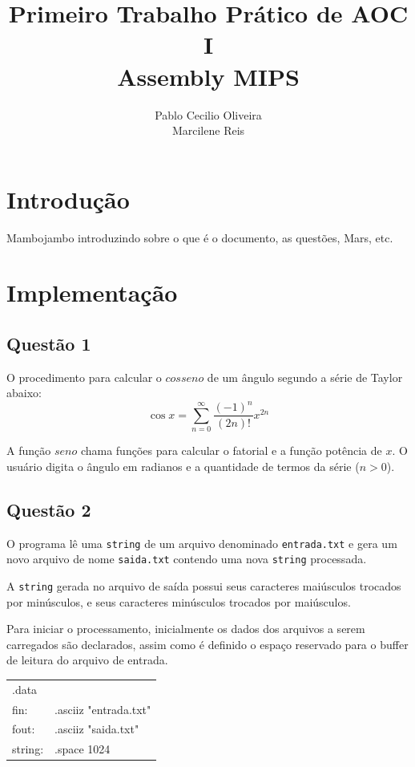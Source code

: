 \documentclass[12pt,a4paper]{article}
\author{Pablo Cecilio Oliveira\\
Marcilene Reis}
\title{Primeiro Trabalho Prático de AOC I\\
Assembly MIPS}
\date{}
\numberwithin{figure}{subsection}
\numberwithin{table}{subsection}
\begin{document}
\maketitle

\section{Introdução}

Mambojambo introduzindo sobre o que é o documento, as questões, Mars, etc.

\lipsum[1]

\section{Implementação}

\subsection{Questão 1}

O procedimento para calcular o $cosseno$ de um ângulo segundo a série de Taylor abaixo:
\[ \cos x = \sum_{n=0}^{\infty} \frac{(-1)^n}{(2n)!} x^{2n} \]

A função $seno$ chama funções para calcular o fatorial e a função potência de $x$. O usuário digita o ângulo em radianos e a quantidade de termos da série ($n>0$).

\subsection{Questão 2}

O programa lê uma \texttt{string} de um arquivo denominado \texttt{entrada.txt} e gera um novo arquivo de nome \texttt{saida.txt} contendo uma nova \texttt{string} processada. 

A \texttt{string} gerada no arquivo de saída possui seus caracteres maiúsculos trocados por minúsculos, e seus  caracteres minúsculos trocados por maiúsculos.

Para iniciar o processamento, inicialmente os dados dos arquivos a serem carregados são declarados, assim como é definido o espaço reservado para o buffer de leitura do arquivo de entrada.

\begin{table}[H]
	\begin{tabular}{>{\ttfamily}l>{\ttfamily}l}
	.data   & \\
	fin:	& .asciiz "entrada.txt" \\
	fout:	& .asciiz "saida.txt" \\
	string:	& .space 1024 \\
	\end{tabular}
\end{table}
\end{document}
